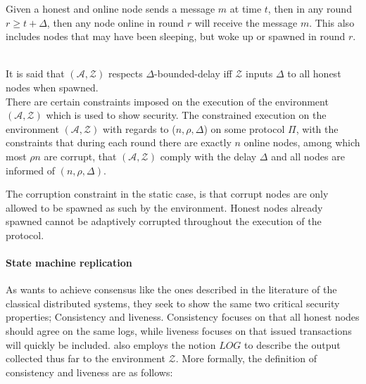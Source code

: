 \hfill\begin{minipage}{\dimexpr\textwidth-0.5cm}
Given a honest and online node sends a message $m$ at time $t$, then in any round $r \geq t + \Delta$, then any node online in round $r$ will receive the message $m$. This also includes nodes that may have been sleeping, but woke up or spawned in round $r$.
\end{minipage} \\


\noindent It is said that $(\mathcal{A}, \mathcal{Z})$ respects $\Delta$-bounded-delay iff $\mathcal{Z}$ inputs $\Delta$ to all honest nodes when spawned.\\


There are certain constraints imposed on the execution of the environment $(\mathcal{A}, \mathcal{Z})$ which is used to show security. The constrained execution on the environment $(\mathcal{A}, \mathcal{Z})$ with regards to ($n,\rho,\Delta$) on some protocol $\Pi$, with the constraints that during each round there are exactly $n$ online nodes, among which most $\rho n$ are corrupt, that $(\mathcal{A}, \mathcal{Z})$ comply with the delay $\Delta$ and all nodes are informed of $(n, \rho, \Delta)$.

The corruption constraint in the static case, is that corrupt nodes are only allowed to be spawned as such by the environment. Honest nodes already spawned cannot be adaptively corrupted throughout the execution of the protocol.

\paragraph{State machine replication} As \cite{thunderella} wants to achieve consensus like the ones described in the literature of the classical distributed systems, they seek to show the same two critical security properties; Consistency and liveness. Consistency focuses on that all honest nodes should agree on the same logs, while liveness focuses on that issued transactions will quickly be included. \cite{thunderella} also employs the notion $LOG$ to describe the output collected thus far to the environment $\mathcal{Z}$. 
More formally, the definition of consistency and liveness are as follows:

